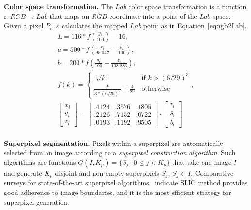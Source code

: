 \noindent 
\textbf{Color space transformation.} 
The $Lab$ color space transformation is a function $\varepsilon: RGB \rightarrow Lab$ that maps an $RGB$ coordinate into a point of the $Lab$ space.
Given a pixel $P_i$, $\varepsilon$ calculates the mapped $Lab$ point as in Equation~\ref{eq:rgb2Lab}.
\begin{equation}\label{eq:rgb2Lab}
\begin{split}
L = 116*f\left(\frac{y_i}{100}\right) - 16,\\
a = 500*f\left(\frac{x_i}{95.047} - \frac{y_i}{100}\right), \\
b = 200*f\left(\frac{y_i}{100} - \frac{z_i}{108.883}\right),\\
f(k) =
\begin{cases}
    \sqrt[3]{k},     & \text{if } k > (6/29)^3 \\
    \frac{k}{3*(6/29)^2} + \frac{4}{29}\,   & \text{otherwise}
\end{cases},\\
\begin{bmatrix}
    x_i\\
    y_i\\
    z_i
\end{bmatrix}
=
\begin{bmatrix}
    .4124 & .3576 & .1805 \\
    .2126 & .7152 & .0722 \\
    .0193 & .1192 & .9505
\end{bmatrix}
\cdot
\begin{bmatrix}
    r_i\\
    g_i\\
    b_i
\end{bmatrix}
\end{split}
\end{equation}\\

\noindent
\textbf{Superpixel segmentation.}
Pixels within a superpixel are automatically selected from an image according to a \textit{superpixel construction algorithm}.
Such algorithms are functions $G(I, K_p) = \{S_j ~|~ 0 \leq j < K_p\}$ that take one image $I$ and generate $K_p$ disjoint and non-empty superpixels $S_j, ~S_j \subset I$.
Comparative surveys for state-of-the-art superpixel algorithms~\cite{Achanta2012,Barbieri2015} indicate SLIC method provides good adherence to image boundaries, and it is the most efficient strategy for superpixel generation.\\

